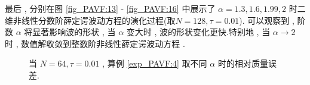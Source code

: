   最后 , 分别在图 \ref{fig_PAVF:13} - \ref{fig_PAVF:16} 中展示了 $\alpha=1.3 , 1.6 , 1.99 , 2$ 时二维非线性分数阶薛定谔波动方程的演化过程(取$N=128 , \tau=0.01$).
  可以观察到 , 阶数 $\alpha$ 将显著影响波的形状 , 当 $\alpha$ 变大时 , 波的形状变化更快.特别地 , 当 $\alpha \rightarrow 2$ 时 , 
  数值解收敛到整数阶非线性薛定谔波动方程 \cite{zhangConservativeNumericalScheme2003,liCompactFiniteDifference2012,wangAnalysisNewConservative2006}.

  \begin{figure}[H]
	\begin{center}
	\vspace{-6mm}
	\caption{当  $N = 64 , \tau=0.01$ , 算例 \ref{exp_PAVF:4} 取不同 $\alpha$ 时的相对质量误差.}
	\label{fig_PAVF:11}
	\end{center}
	\end{figure}
	
